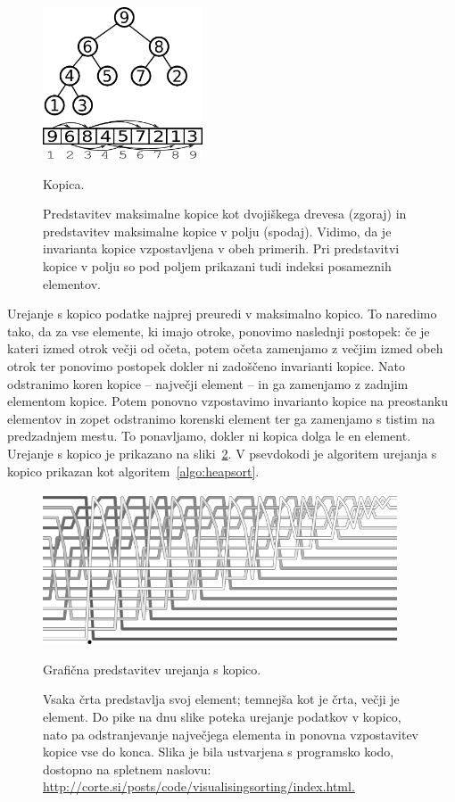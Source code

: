 \documentclass[a4paper,oneside,12pt]{article}
\begin{document}
\begin{figure}[ht]
    \begin{center}
        \includegraphics[height=45mm]{slike/heap.pdf}
    \end{center}
    \vspace{-0.7cm}
    \caption[Kopica]{Kopica.}
    \caption*{{\small Predstavitev maksimalne kopice kot dvojiškega
    drevesa (zgoraj) in predstavitev maksimalne kopice v polju (spodaj). Vidimo,
    da je invarianta kopice vzpostavljena v obeh primerih. Pri predstavitvi
    kopice v polju so pod poljem prikazani tudi indeksi posameznih elementov.}}
    \label{fig:kopica}
\end{figure}


Urejanje s kopico podatke najprej preuredi v maksimalno kopico. To naredimo tako,
da za vse elemente, ki imajo otroke, ponovimo naslednji postopek:
če je kateri izmed otrok večji od očeta, potem očeta zamenjamo z večjim izmed
obeh otrok ter ponovimo postopek dokler ni zadoščeno invarianti kopice.
Nato odstranimo koren kopice -- največji element -- in ga zamenjamo z zadnjim
elementom kopice. Potem ponovno vzpostavimo invarianto kopice na preostanku
elementov in zopet odstranimo korenski element ter ga
zamenjamo s tistim na predzadnjem mestu. To ponavljamo, dokler ni kopica dolga le en
element. Urejanje s kopico je prikazano na sliki~\ref{fig:heapsortimage}.
V psevdokodi je algoritem urejanja s kopico prikazan kot
algoritem~\ref{algo:heapsort}. \\

\begin{figure}[ht]
    \begin{center}
        \includegraphics[height=45mm]{slike/Heap.png}
    \end{center}
    \vspace{-0.7cm}
    \caption[Urejanje s kopico]{Grafična predstavitev urejanja s kopico.}
    \caption*{{\small Vsaka črta predstavlja svoj element; temnejša kot je črta,
    večji je element. Do pike na dnu slike poteka urejanje podatkov v kopico, 
    nato pa odstranjevanje največjega elementa in ponovna vzpostavitev kopice 
    vse do konca. Slika je bila ustvarjena s programsko kodo, dostopno na spletnem
    naslovu: \url{http://corte.si/posts/code/visualisingsorting/index.html.}}}
    \label{fig:heapsortimage}
\end{figure}
\end{document}
